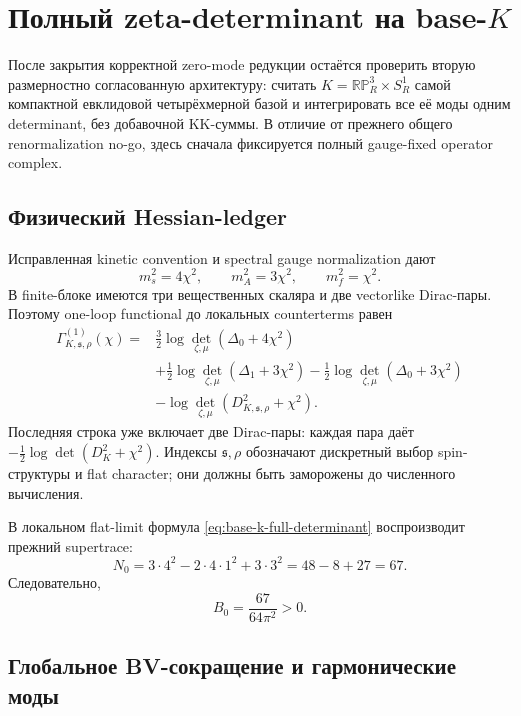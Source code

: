 \chapter{Полный zeta-determinant на \texorpdfstring{base-\(K\)}{base-K}}

После закрытия корректной zero-mode редукции остаётся проверить вторую
размерностно согласованную архитектуру: считать
\(K=\mathbb{RP}^3_R\times S^1_R\) самой компактной евклидовой
четырёхмерной базой и интегрировать все её моды одним determinant, без
добавочной KK-суммы. В отличие от прежнего общего renormalization no-go,
здесь сначала фиксируется полный gauge-fixed operator complex.

\section{Физический Hessian-ledger}

Исправленная kinetic convention и spectral gauge normalization дают
\begin{equation}
 m_s^2=4\chi^2,
 \qquad
 m_A^2=3\chi^2,
 \qquad
 m_f^2=\chi^2.
\end{equation}
В finite-блоке имеются три вещественных скаляра и две vectorlike Dirac-пары.
Поэтому one-loop functional до локальных counterterms равен
\begin{align}
 \Gamma_{K,\mathfrak s,\rho}^{(1)}(\chi)
 ={}&\frac32\log\det_{\zeta,\mu}(\Delta_0+4\chi^2)
 \\
 &+\frac12\log\det_{\zeta,\mu}(\Delta_1+3\chi^2)
 -\frac12\log\det_{\zeta,\mu}(\Delta_0+3\chi^2)
 \\
 &-\log\det_{\zeta,\mu}(D_{K,\mathfrak s,\rho}^2+\chi^2).
 \label{eq:base-k-full-determinant}
\end{align}
Последняя строка уже включает две Dirac-пары: каждая пара даёт
\(-\tfrac12\log\det(D_K^2+\chi^2)\). Индексы
\(\mathfrak s,\rho\) обозначают дискретный выбор spin-структуры и flat
character; они должны быть заморожены до численного вычисления.

В локальном flat-limit формула \eqref{eq:base-k-full-determinant}
воспроизводит прежний supertrace:
\begin{equation}
 N_0
 =3\cdot4^2-2\cdot4\cdot1^2+3\cdot3^2
 =48-8+27
 =67.
\end{equation}
Следовательно,
\begin{equation}
 B_0=\frac{67}{64\pi^2}>0.
\end{equation}

\section{Глобальное BV-сокращение и гармонические моды}

